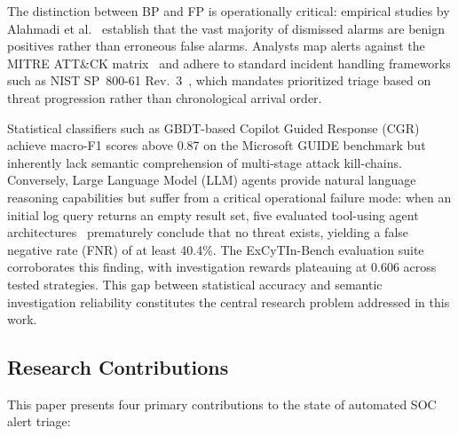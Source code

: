 The distinction between BP and FP is operationally critical: empirical studies by
Alahmadi et al.~\cite{alahmadi2022falsepositives} establish that the vast majority of
dismissed alarms are benign positives rather than erroneous false alarms. Analysts
map alerts against the MITRE ATT\&CK matrix~\cite{sadlek2025killchain} and adhere to
standard incident handling frameworks such as NIST SP~800-61 Rev.~3~\cite{nist2025sp80061r3},
which mandates prioritized triage based on threat progression rather than chronological
arrival order.

Statistical classifiers such as GBDT-based Copilot Guided Response (CGR)~\cite{freitas2024cgr}
achieve macro-F1 scores above 0.87 on the Microsoft GUIDE benchmark but inherently lack
semantic comprehension of multi-stage attack kill-chains. Conversely, Large Language
Model (LLM) agents provide natural language reasoning capabilities but suffer from a
critical operational failure mode: when an initial log query returns an empty result set,
five evaluated tool-using agent architectures~\cite{tsegai2026aida} prematurely conclude
that no threat exists, yielding a false negative rate (FNR) of at least 40.4\%. The
ExCyTIn-Bench evaluation suite~\cite{wu2026excytin} corroborates this finding, with
investigation rewards plateauing at 0.606 across tested strategies. This gap between
statistical accuracy and semantic investigation reliability constitutes the central
research problem addressed in this work.

\subsection{Research Contributions}

This paper presents four primary contributions to the state of automated SOC alert triage:

